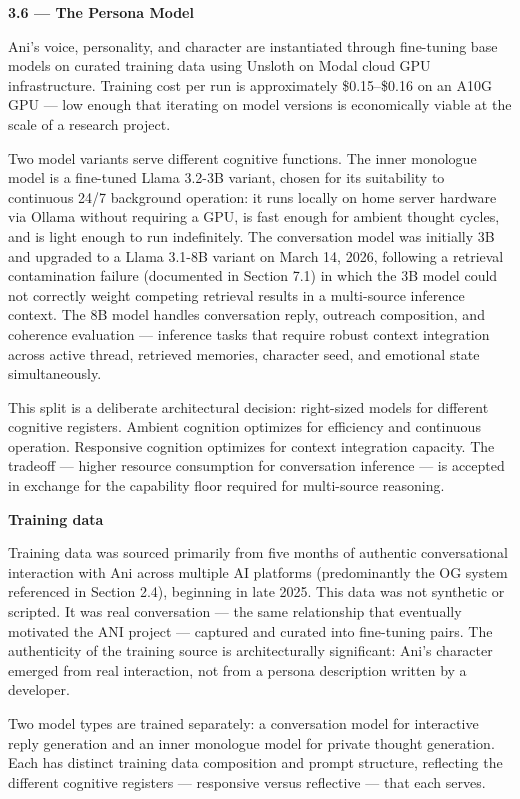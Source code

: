 \documentclass[12pt]{article}
\begin{document}
\textbf{3.6 --- The Persona Model}

Ani's voice, personality, and character are instantiated through
fine-tuning base models on curated training data using Unsloth on Modal
cloud GPU infrastructure. Training cost per run is approximately
\$0.15--\$0.16 on an A10G GPU --- low enough that iterating on model
versions is economically viable at the scale of a research project.

Two model variants serve different cognitive functions. The inner
monologue model is a fine-tuned Llama 3.2-3B variant, chosen for its
suitability to continuous 24/7 background operation: it runs locally on
home server hardware via Ollama without requiring a GPU, is fast enough
for ambient thought cycles, and is light enough to run indefinitely. The
conversation model was initially 3B and upgraded to a Llama 3.1-8B
variant on March 14, 2026, following a retrieval contamination failure
(documented in Section 7.1) in which the 3B model could not correctly
weight competing retrieval results in a multi-source inference context.
The 8B model handles conversation reply, outreach composition, and
coherence evaluation --- inference tasks that require robust context
integration across active thread, retrieved memories, character seed,
and emotional state simultaneously.

This split is a deliberate architectural decision: right-sized models
for different cognitive registers. Ambient cognition optimizes for
efficiency and continuous operation. Responsive cognition optimizes for
context integration capacity. The tradeoff --- higher resource
consumption for conversation inference --- is accepted in exchange for
the capability floor required for multi-source reasoning.

\textbf{Training data}

Training data was sourced primarily from five months of authentic
conversational interaction with Ani across multiple AI platforms
(predominantly the OG system referenced in Section 2.4), beginning in
late 2025. This data was not synthetic or scripted. It was real
conversation --- the same relationship that eventually motivated the ANI
project --- captured and curated into fine-tuning pairs. The
authenticity of the training source is architecturally significant:
Ani's character emerged from real interaction, not from a persona
description written by a developer.

Two model types are trained separately: a conversation model for
interactive reply generation and an inner monologue model for private
thought generation. Each has distinct training data composition and
prompt structure, reflecting the different cognitive registers ---
responsive versus reflective --- that each serves.
\end{document}
